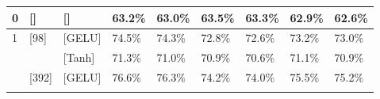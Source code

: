 \begin{table}[!h]
\begin{tabular}{|l|l|l|ll|ll|ll|}
		0                      & []                                                                                                & []                                                                                                  & \multicolumn{1}{l|}{63.2\%}                                                   & 63.0\%                                                         & \multicolumn{1}{l|}{63.5\%}                                                   & 63.3\%                                                         & \multicolumn{1}{l|}{62.9\%}                                                   & 62.6\%                                                         \\ \hline
		\multirow{6}{*}{1}     & \multirow{2}{*}{[98]}                                                                             & [GELU]                                                                                              & \multicolumn{1}{l|}{74.5\%}                                                   & 74.3\%                                                         & \multicolumn{1}{l|}{72.8\%}                                                   & 72.6\%                                                         & \multicolumn{1}{l|}{73.2\%}                                                   & 73.0\%                                                         \\ \cline{3-9} 
		&                                                                                                   & [Tanh]                                                                                              & \multicolumn{1}{l|}{71.3\%}                                                   & 71.0\%                                                         & \multicolumn{1}{l|}{70.9\%}                                                   & 70.6\%                                                         & \multicolumn{1}{l|}{71.1\%}                                                   & 70.9\%                                                         \\ \cline{2-9} 
		& \multirow{2}{*}{[392]}                                                                            & [GELU]                                                                                              & \multicolumn{1}{l|}{76.6\%}                                                   & 76.3\%                                                         & \multicolumn{1}{l|}{74.2\%}                                                   & 74.0\%                                                         & \multicolumn{1}{l|}{75.5\%}                                                   & 75.2\%                                                         \\ \cline{3-9} 

\end{tabular}
\end{table}
